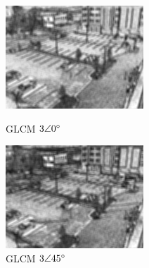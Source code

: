 \documentclass[10pt,twocolumn,letterpaper]{article}
\begin{document}
\begin{figure}[!htb]
  \includegraphics[width=\linewidth]{GLCM0-Homogeneidade.jpg}
  \caption{GLCM $3\angle 0\degree$}\label{fig:glcm0}
\endminipage\hfill
{}
  \includegraphics[width=\linewidth]{GLCM45-Homogeneidade.jpg}
  \caption{GLCM $3\angle 45\degree$}\label{fig:glcm45}
\endminipage
\end{figure}
\end{document}
